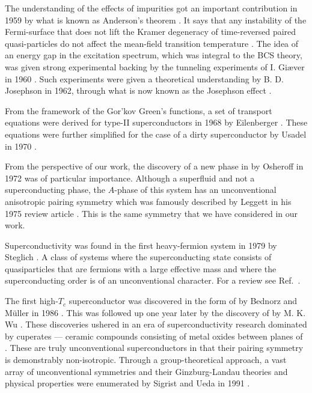 The understanding of the effects of impurities got an important contribution in 1959 by what is known as Anderson's theorem \cite{Anderson59}.
It says that any instability of the Fermi-surface that does not lift the Kramer degeneracy of time-reversed paired quasi-particles do not affect
the mean-field transition temperature \cite{Balatsky06}.
The idea of an energy gap in the excitation spectrum, which was integral to the BCS theory, was given strong experimental backing by the tunneling
experiments of I. Giæver in 1960 \cite{Giaever60}.
Such experiments were given a theoretical understanding by B. D. Josephson in 1962, through what is now known as the Josephson effect
\cite{Josephson62}.

From the framework of the Gor'kov Green's functions, a set of transport equations were derived for type-II superconductors in 1968 by
Eilenberger \cite{Eilenberger68}. These equations were further simplified for the case of a dirty superconductor by Usadel in 1970 \cite{Usadel70}.

From the perspective of our work, the discovery of a new phase in  by Osheroff \etal in 1972 was of particular importance. Although a superfluid
and not a superconducting phase, the $A$-phase of this system has an unconventional anisotropic pairing symmetry which was famously described by Leggett in his
1975 review article \cite{Leggett75}. This is the same symmetry that we have considered in our work.

Superconductivity was found in the first heavy-fermion system  in 1979 by Steglich \etal \cite{Steglich79}. A class of systems where the superconducting
state consists of quasiparticles that are fermions with a large effective mass and where the superconducting order is of an
unconventional character. For a review see Ref.~\cite{White15}.

The first high-$T_c$ superconductor was discovered in the form of  by Bednorz and M\"uller in 1986 \cite{Bednorz86}.
This was followed up one
year later by the discovery of  by M. K. Wu \etal \cite{Wu87}. These discoveries ushered in an era of superconductivity
research dominated by cuperates --- ceramic compounds consisting of metal oxides between planes of . These are truly unconventional
superconductors in that their pairing symmetry is demonstrably non-isotropic. Through a group-theoretical approach, a vast array
of unconventional symmetries and their Ginzburg-Landau theories and physical properties were enumerated by Sigrist and Ueda in 1991 \cite{SigristUeda91}.

